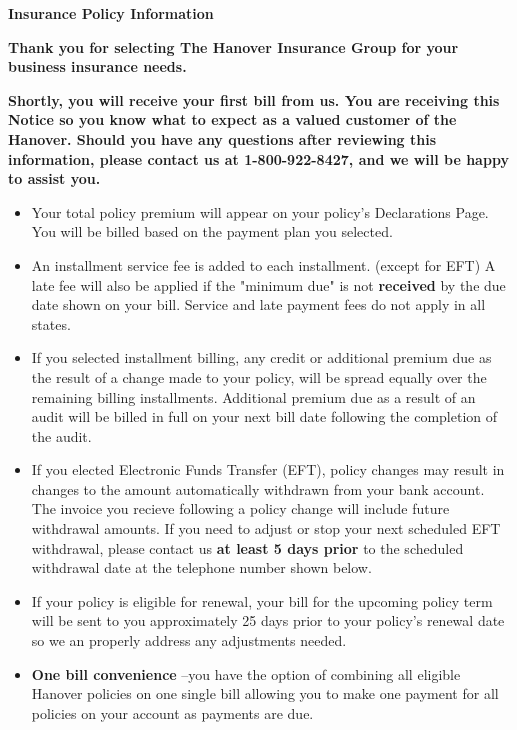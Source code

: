 \documentclass[10pt]{article}
\begin{document}
\newpage
\extramarks{}{}
\noindent \textbf{\huge{Insurance Policy Information}} \newline

\hfill \break

\noindent \textbf{Thank you for selecting The Hanover Insurance Group for your business insurance needs.}

\hfill \break
\noindent \textbf{Shortly, you will receive your first bill from us. You are receiving this Notice so you know what to expect as a valued
customer of the Hanover. Should you have any questions after reviewing this information, please contact us at 
1-800-922-8427, and we will be happy to assist you.}

\begin{itemize}
    \itemsep0em
    \item Your total policy premium will appear on your policy's Declarations Page. You will be billed based on the payment plan you selected.

    \item An installment service fee is added to each installment. (except for EFT) A late fee will also be applied if the "minimum due" is not \textbf{received} by the due date shown on your bill. Service and late payment fees do not apply in all states.

    \item If you selected installment billing, any credit or additional premium due as the result of a change made to your policy, will be spread equally over the remaining billing installments. Additional premium due as a result of an audit will be billed in full on your next bill date following the completion of the audit.

    \item If you elected Electronic Funds Transfer (EFT), policy changes may result in changes to the amount automatically withdrawn from your bank account. The invoice you recieve following a policy change will include future withdrawal amounts. If you need to adjust or stop your next scheduled EFT withdrawal, please contact us \textbf{at least 5 days prior} to the scheduled withdrawal date at the telephone number shown below.

    \item If your policy is eligible for renewal, your bill for the upcoming policy term will be sent to you approximately 25 days prior to your policy's renewal date so we an properly address any adjustments needed.
    
    \item \textbf{One bill convenience} --you have the option of combining all eligible Hanover policies on one single bill allowing you to make one payment for all policies on your account as payments are due.
\end{itemize}
\end{document}
